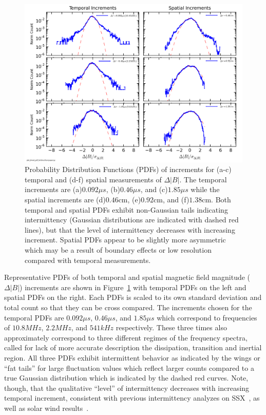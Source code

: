 \documentclass[preprint2]{aastex}
\begin{document}
\begin{figure}
\includegraphics{Bmod_pdf_temporal_and_spatial_100313Shots41to80_forStructFuncpaper.png}
\caption{\label{fig:pdfs}Probability Distribution Functions (PDFs) of increments for (a-c) temporal and (d-f) spatial measurements of $\Delta |B|$. The temporal increments are (a)$0.092\mu s$, (b)$0.46\mu s$, and (c)$1.85\mu s$ while the spatial increments are (d)$0.46$cm, (e)$0.92$cm, and (f)$1.38$cm. Both temporal and spatial PDFs exhibit non-Gaussian tails indicating intermittency (Gaussian distributions are indicated with dashed red lines), but that the level of intermittency decreases with increasing increment. Spatial PDFs appear to be slightly more asymmetric which may be a result of boundary effects or low resolution compared with temporal measurements.}
\end{figure}

Representative PDFs of both temporal and spatial magnetic field magnitude ($\Delta |B|$) increments are shown in Figure~\ref{fig:pdfs} with temporal PDFs on the left and spatial PDFs on the right. Each PDFs is scaled to its own standard deviation and total count so that they can be cross compared. The increments chosen for the temporal PDFs are $0.092\mu s$, $0.46\mu s$, and $1.85\mu s$ which correspond to frequencies of $10.8MHz$, $2.2MHz$, and $541kHz$ respectively. These three times also approximately correspond to three different regimes of the frequency spectra, called for lack of more accurate description the dissipation, transition and inertial region. All three PDFs exhibit intermittent behavior as indicated by the wings or ``fat tails'' for large fluctuation values which reflect larger counts compared to a true Gaussian distribution which is indicated by the dashed red curves. Note, though, that the qualitative ``level'' of intermittency decreases with increasing temporal increment, consistent with previous intermittency analyzes on SSX~\citep{schaffner2014a,schaffner2014b}, as well as solar wind results~\citep{bruno2013}.
\end{document}
